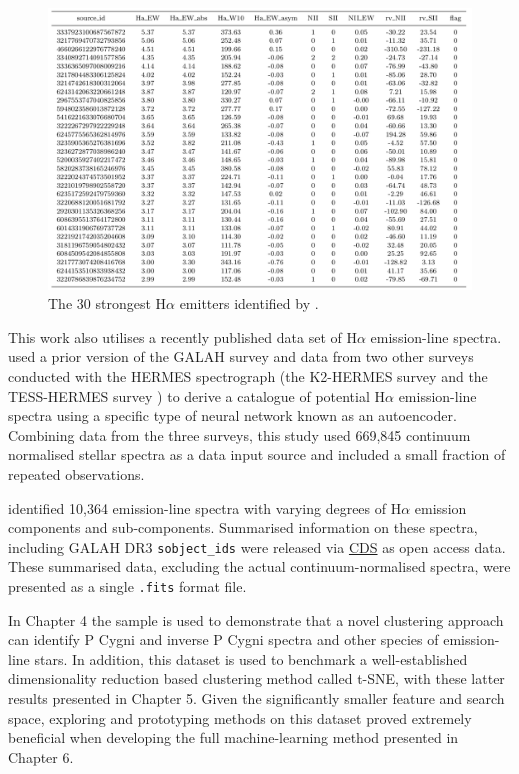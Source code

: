 \begin{figure}[!htb]
\centering
\includegraphics[scale=.45]{figures/cotartable.png}
\caption{The 30 strongest H$\alpha$ emitters identified by \citet{vcotar2021galah}.}
\end{figure}

This work also utilises a recently published data set of H$\alpha$ emission-line spectra. \citet{vcotar2021galah} used a prior version of the GALAH survey \citep{de2015galah} and data from two other surveys conducted with the HERMES spectrograph (the K2-HERMES survey \citep{wittenmyer2018k2} and the TESS-HERMES survey \citep{sharma2018tess}) to derive a catalogue of potential H$\alpha$ emission-line spectra using a specific type of neural network known as an autoencoder. Combining data from the three surveys, this study used 669,845 continuum normalised stellar spectra as a data input source and included a small fraction of repeated observations. 

\citet{vcotar2021galah} identified 10,364 emission-line spectra with varying degrees of H$\alpha$ emission components and sub-components. Summarised information on these spectra, including GALAH DR3 \texttt{sobject\_ids} were released via \href{https://cdsweb.u-strasbg.fr/}{CDS} as open access data. These summarised data, excluding the actual continuum-normalised spectra, were presented as a single \texttt{.fits} format file. 

In Chapter 4 the \citet{vcotar2021galah} sample is used to demonstrate that a novel clustering approach can identify P Cygni and inverse P Cygni spectra and other species of emission-line stars. In addition, this dataset is used to benchmark a well-established dimensionality reduction based clustering method called t-SNE, with these latter results presented in Chapter 5. Given the significantly smaller feature and search space, exploring and prototyping methods on this dataset proved extremely beneficial when developing the full machine-learning method presented in Chapter 6.

